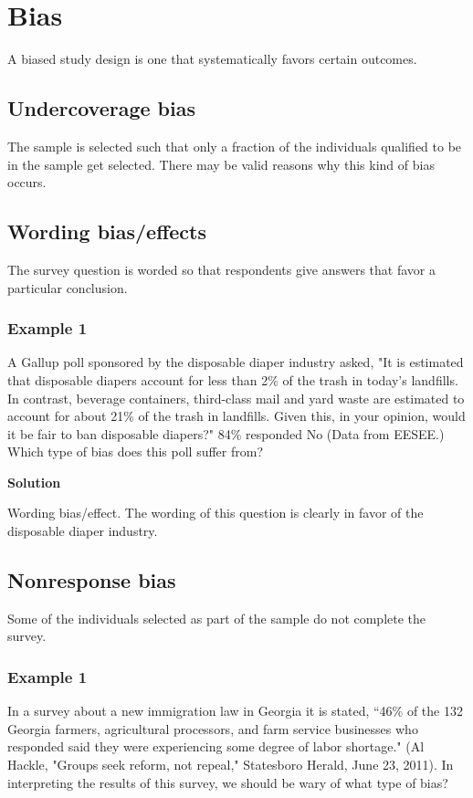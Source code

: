 \section{Bias}
A biased study design is one that systematically favors certain outcomes. 

\subsection{Undercoverage bias}
The sample is selected such that only a fraction of the individuals qualified to be in the sample get selected. There may be valid reasons why this kind of bias occurs.  

\subsection{Wording bias/effects}
The survey question is worded so that respondents give answers that favor a particular conclusion. 

\subsubsection*{Example 1}
A Gallup poll sponsored by the disposable diaper industry asked, "It is estimated that disposable diapers account for less than 2\% of the trash in today's landfills. In contrast, beverage containers, third-class mail and yard waste are estimated to account for about 21\% of the trash in landfills. Given this, in your opinion, would it be fair to ban disposable diapers?" 84\% responded No (Data from EESEE.) Which type of bias does this poll suffer from?

\vspace{0.2cm}

\textbf{Solution}

\vspace{0.2cm}

\noindent Wording bias/effect. The wording of this question is clearly in favor of the disposable diaper industry.

\subsection{Nonresponse bias}
Some of the individuals selected as part of the sample do not complete the survey. 

\subsubsection*{Example 1}
In a survey about a new immigration law in Georgia it is stated, ``46\% of the 132 Georgia farmers, agricultural processors, and farm service businesses who responded said they were experiencing some degree of labor shortage." (Al Hackle, "Groups seek reform, not repeal," Statesboro Herald, June 23, 2011). In interpreting the results of this survey, we should be wary of what type of bias?

